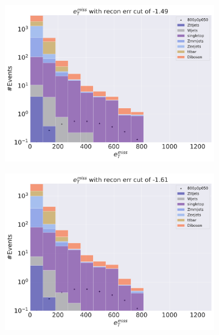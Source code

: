 \begin{figure}
\begin{subfigure}{.45\textwidth}
        \caption{}
        \label{fig:AE_2lep_small_450_cut_etmiss}
    \end{subfigure}
    \hfill
    \begin{subfigure}{.45\textwidth}
        \includegraphics[width=\textwidth]{Figures/AE_testing/big/2lep/b_data_recon_big_rm3_feats_sig_800p0p050_recon_errcut_-1.49.pdf}
        \caption{}
        \label{fig:AE_2lep_big_800_cut_etmiss}
    \end{subfigure}
    \hfill   
    \begin{subfigure}{.45\textwidth}
        \includegraphics[width=\textwidth]{Figures/AE_testing/small/2lep/b_data_recon_big_rm3_feats_sig_800p0p050_recon_errcut_-1.61.pdf}
        \caption{}
        \label{fig:AE_2lep_small_800_cut_etmiss}

\end{subfigure}
\end{figure}
